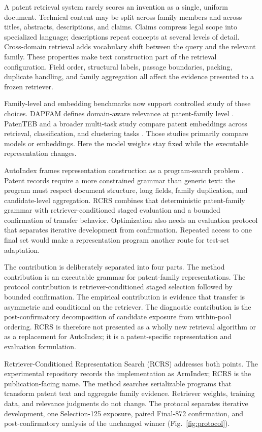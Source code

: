 \documentclass[final,5p,times,twocolumn]{elsarticle}
\newcommand{\RCRS}{RCRS}
\begin{document}
A patent retrieval system rarely scores an invention as a single, uniform
document. Technical content may be split across family members and across
titles, abstracts, descriptions, and claims. Claims compress legal scope into
specialized language; descriptions repeat concepts at several levels of
detail. Cross-domain retrieval adds vocabulary shift between the query and the
relevant family. These properties make text construction part of the retrieval
configuration. Field order, structural labels, passage boundaries, packing,
duplicate handling, and family aggregation all affect the evidence presented
to a frozen retriever.

Family-level and embedding benchmarks now support controlled study of these
choices. DAPFAM defines domain-aware relevance at patent-family level
\cite{dapfam2026}. PatenTEB and a broader multi-task study compare patent
embeddings across retrieval, classification, and clustering tasks
\cite{patenteb2025,patentembeddings2026}. Those studies primarily compare
models or embeddings. Here the model weights stay fixed while the executable
representation changes.

AutoIndex frames representation construction as a program-search problem
\cite{autoindex2026}. Patent records require a more constrained grammar than
generic text: the program must respect document structure, long fields,
family duplication, and candidate-level aggregation. RCRS combines that
deterministic patent-family grammar with retriever-conditioned staged
evaluation and a bounded confirmation of transfer behavior. Optimization also
needs an evaluation protocol that separates iterative development from
confirmation.
Repeated access to one final set would make a representation program another
route for test-set adaptation.

The contribution is deliberately separated into four parts. The method
contribution is an executable grammar for patent-family representations. The
protocol contribution is retriever-conditioned staged selection followed by
bounded confirmation. The empirical contribution is evidence that transfer is
asymmetric and conditional on the retriever. The diagnostic contribution is
the post-confirmatory decomposition of candidate exposure from within-pool
ordering. RCRS is therefore not presented as a wholly new retrieval algorithm
or as a replacement for AutoIndex; it is a patent-specific representation and
evaluation formulation.

Retriever-Conditioned Representation Search (\RCRS{}) addresses both points.
The experimental repository records the implementation as ArmIndex; \RCRS{}
is the publication-facing name. The method searches serializable
programs that transform patent text and aggregate family evidence. Retriever
weights, training data, and relevance judgments do not change. The protocol
separates iterative development, one Selection-125 exposure, paired Final-872
confirmation, and post-confirmatory analysis of the unchanged winner
(Fig.~\ref{fig:protocol}).
\end{document}
